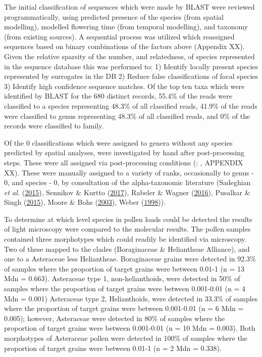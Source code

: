 \documentclass[
]{article}
\begin{document}
The initial classification of sequences which were made by BLAST were
reviewed programmatically, using predicted presence of the species (from
spatial modelling), modelled flowering time (from temporal modelling),
and taxonomy (from existing sources). A sequential process was utilized
which reassigned sequences based on binary combinations of the factors
above (Appendix XX). Given the relative sparsity of the number, and
relatedness, of species represented in the sequence database this was
performed to: 1) Identify locally present species represented by
surrogates in the DB 2) Reduce false classifications of focal species 3)
Identify high confidence sequence matches. Of the top ten taxa which
were identified by BLAST for the 680 distinct records, 55.4\% of the
reads were classified to a species representing 48.3\% of all classified
reads, 41.9\% of the reads were classified to genus representing 48.3\%
of all classified reads, and 0\% of the records were classified to
family.

Of the 0 classifications which were assigned to genera without any
species predicted by spatial analyses, were investigated by hand after
post-processing steps. These were all assigned via post-processing
conditions (: , APPENDIX XX). These were manually assigned to a variety
of ranks, occasionally to genus - 0, and species - 0, by consultation of
the alpha-taxonomic literature (Sadeghian \emph{et al.}
(\protect\hyperlink{ref-sadeghian2015molecular}{2015}), Sennikov \&
Kurtto (\protect\hyperlink{ref-sennikov2017phylogenetic}{2017}), Rabeler
\& Wagner (\protect\hyperlink{ref-rabeler2016new}{2016}), Pusalkar \&
Singh (\protect\hyperlink{ref-pusalkar2015taxonomic}{2015}), Moore \&
Bohs (\protect\hyperlink{ref-moore2003its}{2003}), Weber
(\protect\hyperlink{ref-weber1998new}{1998})).

To determine at which level species in pollen loads could be detected
the results of light microscopy were compared to the molecular results.
The pollen samples contained three morphotypes which could readily be
identified via microscopy. Two of these mapped to the clades
(Boraginaceae \& Heliantheae Alliance), and one to a Asteraceae less
Heliantheae. Boraginaceae grains were detected in 92.3\% of samples
where the proportion of target grains were between 0.01-1 (n = 13 Mdn =
0.663). Asteraceae type 1, non-helianthoids, were detected in 50\% of
samples where the proportion of target grains were between 0.001-0.01 (n
= 4 Mdn = 0.001) Asteraceae type 2, Helianthoids, were detected in
33.3\% of samples where the proportion of target grains were between
0.001-0.01 (n = 6 Mdn = 0.005); however, Asteraceae were detected in
80\% of samples where the proportion of target grains were between
0.001-0.01 (n = 10 Mdn = 0.003). Both morphotypes of Asteraceae pollen
were detected in 100\% of samples where the proportion of target grains
were between 0.01-1 (n = 2 Mdn = 0.338).
\end{document}
